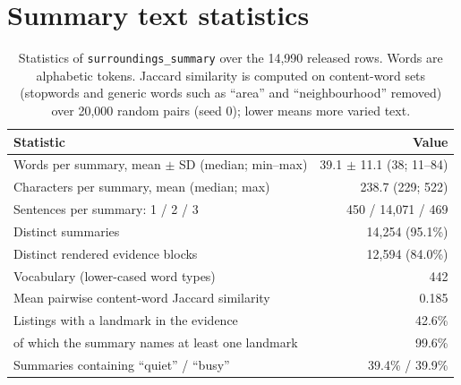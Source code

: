 \documentclass{article}
\begin{document}
\FloatBarrier
\section{Summary text statistics}
\label{app:text-stats}

\begin{table}[h]
  \caption{Statistics of \texttt{surroundings\_summary} over the 14,990 released rows. Words are alphabetic tokens.
    Jaccard similarity is computed on content-word sets (stopwords and generic words such as ``area'' and ``neighbourhood'' removed)
    over 20,000 random pairs (seed 0); lower means more varied text.}
  \label{tab:text-stats}
  \centering
  \small
  \begin{tabular}{lr}
    \toprule
    Statistic & Value \\
    \midrule
    Words per summary, mean $\pm$ SD (median; min--max) & 39.1 $\pm$ 11.1 (38; 11--84) \\
    Characters per summary, mean (median; max) & 238.7 (229; 522) \\
    Sentences per summary: 1 / 2 / 3 & 450 / 14,071 / 469 \\
    Distinct summaries & 14,254 (95.1\%) \\
    Distinct rendered evidence blocks & 12,594 (84.0\%) \\
    Vocabulary (lower-cased word types) & 442 \\
    Mean pairwise content-word Jaccard similarity & 0.185 \\
    Listings with a landmark in the evidence & 42.6\% \\
    \quad of which the summary names at least one landmark & 99.6\% \\
    Summaries containing ``quiet'' / ``busy'' & 39.4\% / 39.9\% \\
    \bottomrule
  \end{tabular}
\end{table}

\end{document}

